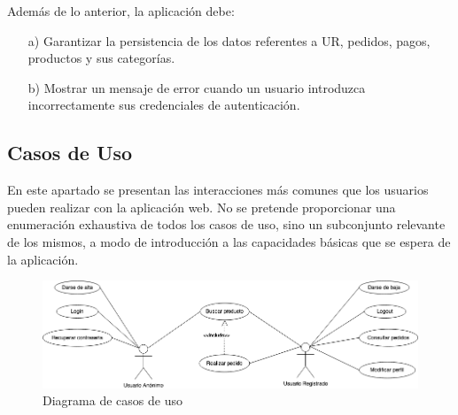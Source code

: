 \documentclass[a4paper]{article}
\begin{document}
            Además de lo anterior, la aplicación debe:
            \begin{enumerate}
                \item[a)] Garantizar la persistencia de los datos referentes a UR, pedidos, pagos, productos y sus categorías.
                \item[b)] Mostrar un mensaje de error cuando un usuario introduzca incorrectamente sus credenciales de autenticación.
            \end{enumerate}

        \subsection{Casos de Uso}
            En este apartado se presentan las interacciones más comunes que los usuarios pueden realizar con la aplicación web. No se pretende proporcionar una enumeración exhaustiva de todos los casos de uso, sino un subconjunto relevante de los mismos, a modo de introducción a las capacidades básicas que se espera de la aplicación.

            \begin{figure}[htb!]
                \centering
                \includegraphics[width=\textwidth]{use-case_diagram}
                \caption{Diagrama de casos de uso}
                \label{fig:use-case_diagram}
            \end{figure}
\end{document}
